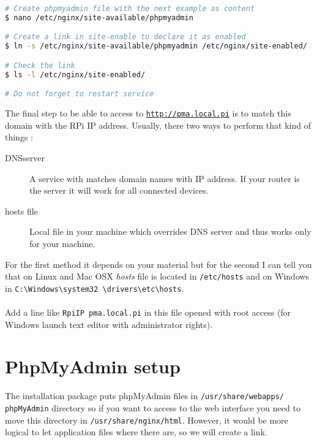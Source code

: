 \begin{lstlisting}[language=bash,caption=Create a subdomain]
# Create phpmyadmin file with the next example as content
$ nano /etc/nginx/site-available/phpmyadmin

# Create a link in site-enable to declare it as enabled
$ ln -s /etc/nginx/site-available/phpmyadmin /etc/nginx/site-enabled/

# Check the link
$ ls -l /etc/nginx/site-enabled/

# Do not forget to restart service
\end{lstlisting} 

\lstset{language=bash,caption=PhpMyAdmin domain example}


The final step to be able to access to \href{http://pma.local.pi}
{\texttt{http://pma.local.pi}} is to match this domain with the RPi IP address. 
Usually, there two ways to perform that kind of things :
\begin{description}
	\item[DNS\footnotemark server] 
					  A service with matches 
					  domain names with IP address. If your router is the server 
					  it will work for all connected devices.
					  
	\item[hosts file] Local file in your machine which overrides DNS server and 
					 thus works only for your machine.\\
\end{description}

For the first method it depends on your material but for the second I can tell you 
that on Linux and Mac OSX \emph{hosts} file is located in \texttt{/etc/hosts} and 
on Windows in \texttt{C:\textbackslash{}Windows\textbackslash{}system32
\textbackslash{}drivers\textbackslash{}etc\textbackslash{}hosts}. 
\\\\
Add a line like \og{}\texttt{RpiIP pma.local.pi}\fg{} in this file opened with 
root access (for Windows launch text editor with administrator rights).

\section{PhpMyAdmin setup}\label{section:PhpMyAdmin}
The installation package puts phpMyAdmin files in \texttt{/usr/share/webapps/
phpMyAdmin} directory so if you want to access to the web interface you need to 
move this directory in \texttt{/usr/share/nginx/html}. However, it would be more 
logical to let application files where there are, so we will create a link.

